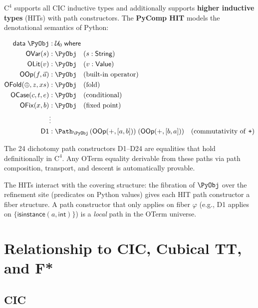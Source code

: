 $\mathrm{C}^4$ supports all CIC inductive types and additionally
supports \textbf{higher inductive types} (HITs) with path
constructors.  The \textbf{PyComp HIT} models the denotational
semantics of Python:

\begin{example}
\vspace{-4pt}
\begin{align*}
  \mathsf{data}\; \PyObj &: \mathcal{U}_0 \;\mathsf{where} \\
  \mathsf{OVar}(s)   &: \PyObj \quad (s : \mathsf{String}) \\
  \mathsf{OLit}(v)   &: \PyObj \quad (v : \mathsf{Value}) \\
  \mathsf{OOp}(f, \vec{a}) &: \PyObj \quad \text{(built-in operator)} \\
  \mathsf{OFold}(\oplus, z, xs) &: \PyObj \quad \text{(fold)} \\
  \mathsf{OCase}(c, t, e) &: \PyObj \quad \text{(conditional)} \\
  \mathsf{OFix}(x, b) &: \PyObj \quad \text{(fixed point)} \\
  &\vdots \\
  \mathsf{D1}     &: \Path_\PyObj\,
    (\mathsf{OOp}(+, [a, b]))\;
    (\mathsf{OOp}(+, [b, a]))
    \quad \text{(commutativity of \texttt{+})}
\end{align*}

The 24 dichotomy path constructors D1--D24 are equalities that
hold definitionally in $\mathrm{C}^4$.  Any OTerm equality derivable
from these paths via path composition, transport, and descent is
automatically provable.
\end{example}

The HITs interact with the covering structure: the fibration of
\(\PyObj\) over the refinement site (predicates on Python values)
gives each HIT path constructor a fiber structure.  A path
constructor that only applies on fiber \(\varphi\) (e.g., D1 applies
on \(\{\mathsf{isinstance}(a, \mathsf{int})\}\)) is a
\emph{local} path in the OTerm universe.


\section{Relationship to CIC, Cubical TT, and F*}
\label{sec:relationships}

\subsection{CIC}

